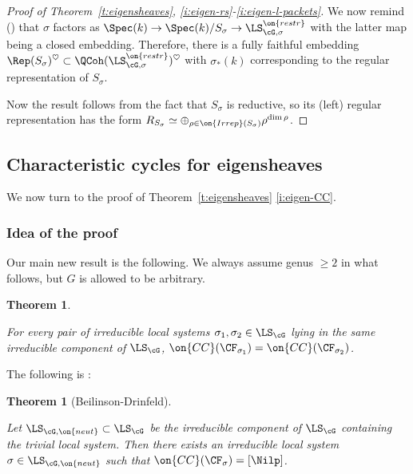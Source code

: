 \documentclass[9pt]{amsart}
\newtheorem{thm}[subsubsection]{Theorem}
\theoremstyle{remark}
\theoremstyle{definition}
\theoremstyle{remark}
\newcommand{\thmref}[1]{Theorem~\ref{#1}}
\numberwithin{equation}{section}
\begin{document}
\begin{proof}[Proof of \thmref{t:eigensheaves}, 
\eqref{i:eigen-rs}-\eqref{i:eigen-l-packets}]
\medskip 

We now remind (\cite[Prop. 4.3.5]{AGKRRV}) that $\sigma$ factors
as $\Spec(k) \to \Spec(k)/S_{\sigma} \to \LS_{\cG,\sigma}^{\on{restr}}$ with the
latter map being a closed embedding. Therefore, 
there is a fully faithful embedding 
$\Rep(S_{\sigma})^{\heartsuit} \subset \QCoh(\LS_{\cG,\sigma}^{\on{restr}})^{\heartsuit}$ 
with $\sigma_*(k)$ corresponding to the regular representation of $S_{\sigma}$.

\medskip 

Now the result follows from the fact that $S_{\sigma}$ is reductive,
so its (left) regular representation has the form
$R_{S_{\sigma}} \simeq \oplus_{\rho \in \on{Irrep}(S_{\sigma})} \rho^{\dim \rho}$.

\end{proof}

\subsection{Characteristic cycles for eigensheaves}

We now turn to the proof of \thmref{t:eigensheaves} \eqref{i:eigen-CC}.

\subsubsection{Idea of the proof}

Our main new result is the following. We always assume genus $\geq 2$ 
in what follows, but $G$ is allowed to be arbitrary.

\begin{thm}\label{t:cc-cts}

For every pair of irreducible local systems 
$\sigma_1,\sigma_2 \in \LS_{\cG}$ lying in the same irreducible component
of $\LS_{\cG}$, $\on{CC}(\CF_{\sigma_1}) = 
\on{CC}(\CF_{\sigma_2})$.

\end{thm}

The following is \cite[Prop. 5.1.2]{BD}:

\begin{thm}[Beilinson-Drinfeld]\label{t:cc-existence}

Let $\LS_{\cG,\on{neut}} \subset \LS_{\cG}$ be the irreducible
component of $\LS_{\cG}$ containing the trivial local system. 
Then there exists an irreducible local system $\sigma \in \LS_{\cG,\on{neut}}$ 
such that $\on{CC}(\CF_{\sigma}) = [\Nilp]$.

\end{thm}
\end{document}
